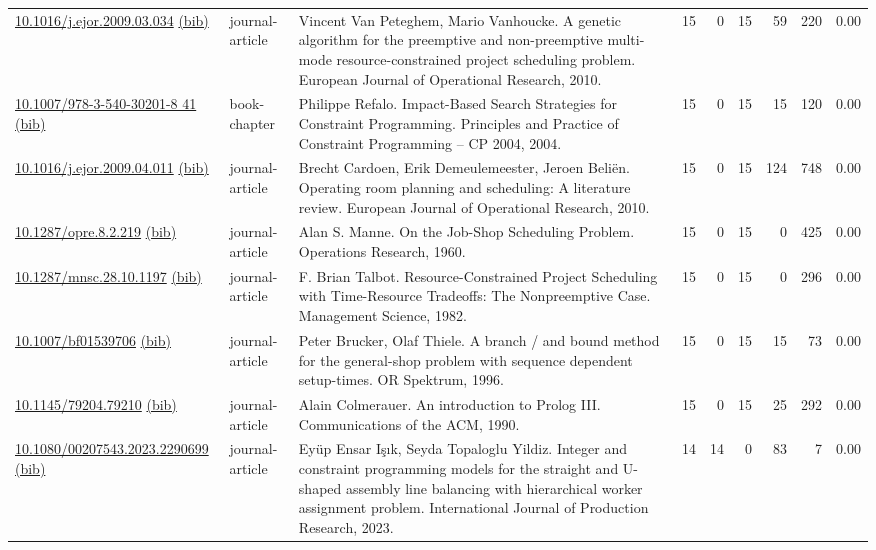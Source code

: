 {\begin{longtable}{p{5cm}lp{11cm}rrrrrr}
\href{http://dx.doi.org/10.1016/j.ejor.2009.03.034}{10.1016/j.ejor.2009.03.034} \href{https://www.doi2bib.org/bib/10.1016/j.ejor.2009.03.034}{(bib)} & journal-article & Vincent Van Peteghem, Mario Vanhoucke. A genetic algorithm for the preemptive and non-preemptive multi-mode resource-constrained project scheduling problem. European Journal of Operational Research, 2010. & 15 & 0 & 15 & 59 & 220 &  0.00\\
\href{http://dx.doi.org/10.1007/978-3-540-30201-8_41}{10.1007/978-3-540-30201-8 41} \href{https://www.doi2bib.org/bib/10.1007/978-3-540-30201-8_41}{(bib)} & book-chapter & Philippe Refalo. Impact-Based Search Strategies for Constraint Programming. Principles and Practice of Constraint Programming – CP 2004, 2004. & 15 & 0 & 15 & 15 & 120 &  0.00\\
\href{http://dx.doi.org/10.1016/j.ejor.2009.04.011}{10.1016/j.ejor.2009.04.011} \href{https://www.doi2bib.org/bib/10.1016/j.ejor.2009.04.011}{(bib)} & journal-article & Brecht Cardoen, Erik Demeulemeester, Jeroen Beliën. Operating room planning and scheduling: A literature review. European Journal of Operational Research, 2010. & 15 & 0 & 15 & 124 & 748 &  0.00\\
\href{http://dx.doi.org/10.1287/opre.8.2.219}{10.1287/opre.8.2.219} \href{https://www.doi2bib.org/bib/10.1287/opre.8.2.219}{(bib)} & journal-article & Alan S. Manne. On the Job-Shop Scheduling Problem. Operations Research, 1960. & 15 & 0 & 15 & 0 & 425 &  0.00\\
\href{http://dx.doi.org/10.1287/mnsc.28.10.1197}{10.1287/mnsc.28.10.1197} \href{https://www.doi2bib.org/bib/10.1287/mnsc.28.10.1197}{(bib)} & journal-article & F. Brian Talbot. Resource-Constrained Project Scheduling with Time-Resource Tradeoffs: The Nonpreemptive Case. Management Science, 1982. & 15 & 0 & 15 & 0 & 296 &  0.00\\
\href{http://dx.doi.org/10.1007/bf01539706}{10.1007/bf01539706} \href{https://www.doi2bib.org/bib/10.1007/bf01539706}{(bib)} & journal-article & Peter Brucker, Olaf Thiele. A branch / and  bound method for the general-shop problem with sequence dependent setup-times. OR Spektrum, 1996. & 15 & 0 & 15 & 15 & 73 &  0.00\\
\href{http://dx.doi.org/10.1145/79204.79210}{10.1145/79204.79210} \href{https://www.doi2bib.org/bib/10.1145/79204.79210}{(bib)} & journal-article & Alain Colmerauer. An introduction to Prolog III. Communications of the ACM, 1990. & 15 & 0 & 15 & 25 & 292 &  0.00\\
\href{http://dx.doi.org/10.1080/00207543.2023.2290699}{10.1080/00207543.2023.2290699} \href{https://www.doi2bib.org/bib/10.1080/00207543.2023.2290699}{(bib)} & journal-article & Eyüp Ensar Işık, Seyda Topaloglu Yildiz. Integer and constraint programming models for the straight and U-shaped assembly line balancing with hierarchical worker assignment problem. International Journal of Production Research, 2023. & 14 & 14 & 0 & 83 & 7 &  0.00\\

\end{longtable}}

